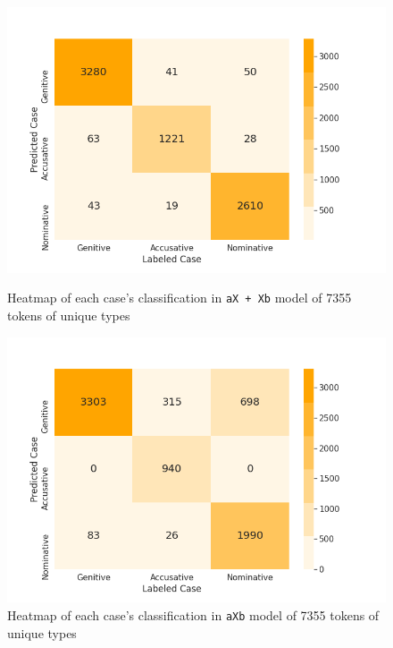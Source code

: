\FloatBarrier
\begin{figure}[!h]
  \centering
    \includegraphics[scale = 0.45]{graph/aXXbheatmap7355.png}
    \caption{Heatmap of each case's classification in \texttt{aX + Xb} model of 7355 tokens of unique types}
    \label{fig:heatmap3}
    \includegraphics[scale = .45]{graph/aXbheatmap7355.png}
    \caption{Heatmap of each case's classification in \texttt{aXb} model of 7355 tokens of unique types}
    \label{fig:heatmap4} 
\end{figure}
\FloatBarrier

